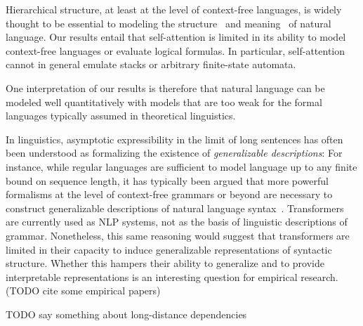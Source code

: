 \documentclass[11pt,a4paper]{article}
\begin{document}
Hierarchical structure, at least at the level of context-free languages, is widely thought to be essential to modeling the structure~\cite{everaert2015structures} and meaning~\cite{montague1973proper} of natural language.
Our results entail that self-attention is limited in its ability to model context-free languages or evaluate logical formulas.
In particular, self-attention cannot in general emulate stacks or arbitrary finite-state automata.

One interpretation of our results is therefore that natural language can be modeled well quantitatively with models that are too weak for the formal languages typically assumed in theoretical linguistics.


In linguistics, asymptotic expressibility in the limit of long sentences has often been understood as formalizing the existence of \emph{generalizable descriptions}:
For instance, while regular languages are sufficient to model language up to any finite bound on sequence length, it has typically been argued that more powerful formalisms at the level of context-free grammars or beyond are necessary to construct generalizable descriptions of natural language syntax~\citep{chomsky1957syntactic,shieber1985evidence}.
Transformers are currently used as NLP systems, not as the basis of linguistic descriptions of grammar.
Nonetheless, this same reasoning would suggest that transformers are limited in their capacity to induce generalizable representations of syntactic structure.
Whether this hampers their ability to generalize and to provide interpretable representations is an interesting question for empirical research. (TODO cite some empirical papers)





TODO say something about long-distance dependencies



\end{document}
